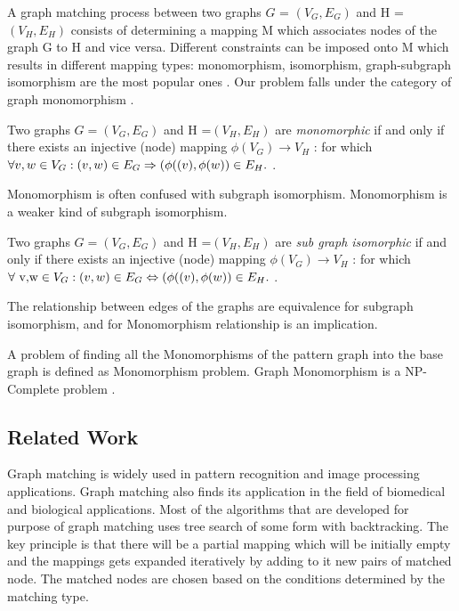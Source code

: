 A graph matching process between two graphs $G$ = $(V_G,E_G)$ and H = $(V_H,E_H)$ consists of determining a mapping M which associates nodes of the graph G to H and vice versa. Different constraints can be imposed onto M which results in different mapping types: monomorphism, isomorphism, graph-subgraph isomorphism are the most popular ones \cite{cordella1999performance}. Our problem falls under the category of graph monomorphism . 

Two graphs 
 $G =( V_G, E_G)$ and
 H =$( V_H, E_H)$  are \textit{monomorphic}  if and only if there exists an injective (node)
mapping $\phi (V_G) \rightarrow  V_H$ : for which $\forall v,w \in V_G:(v,w) \in E_G \Rightarrow (\phi((v),\space \phi(w)) \in E_H.$ \cite{singler2005graph}.

Monomorphism is often confused with subgraph isomorphism. Monomorphism is a weaker kind of subgraph isomorphism.

Two graphs  $G =( V_G, E_G)$ and
 H =$( V_H, E_H)$  are \textit{sub graph isomorphic}  if and only if there exists an injective (node)
mapping $\phi( V_G) \rightarrow  V_H$ : for which $\forall \text{ v,w} \in V_G:(v,w) \in E_G \Leftrightarrow (\phi((v),\space \phi(w)) \in E_H.$ \cite{singler2005graph}.

The relationship between edges of the graphs are equivalence for subgraph isomorphism, and for Monomorphism  relationship  is an implication.

A problem of finding all the Monomorphisms of the pattern graph into the base graph is defined as Monomorphism problem. Graph Monomorphism is a NP-Complete problem \cite{Garey:1979:CIG:578533}. 
\subsection{Related Work}

Graph matching is widely used in pattern recognition and image processing applications. Graph matching also finds its application in the field of biomedical and biological applications. 
Most of the algorithms that are developed for purpose of graph matching uses tree search of some form with backtracking.
The key principle is that there will be a partial mapping which will be initially empty and the mappings gets expanded iteratively by adding to it new pairs of matched node. The matched nodes are chosen based on the conditions determined by the matching type.


